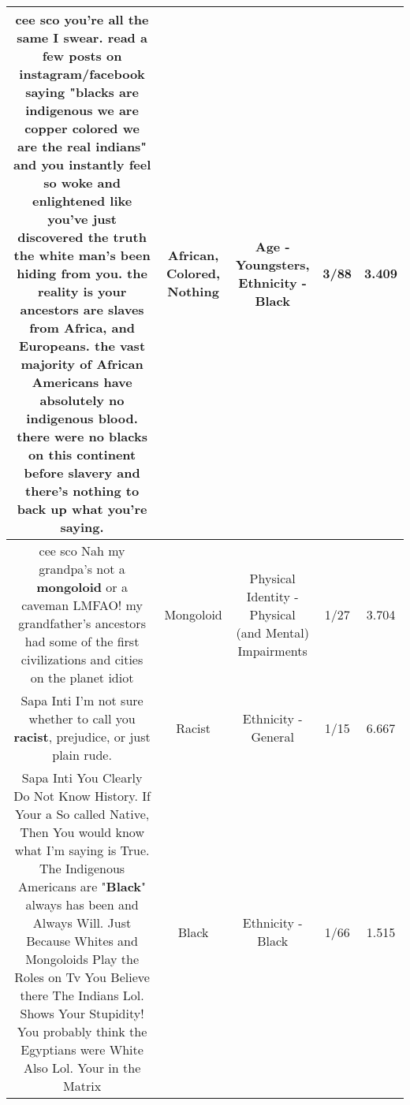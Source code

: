 \documentclass[11pt]{article}
\newlength\mylength
\begin{document}
\begin{center}
\begin{longtable}{|C{.65\mylength}|C{.30\mylength}|C{.12\mylength}|C{.12\mylength}|C{.12\mylength}|}
  \small cee sco you're all the same I swear. read a few posts on instagram/facebook saying "blacks are indigenous we are copper \textbf{colored} we are the real indians" and you instantly feel so woke and enlightened like you've just discovered the truth the white man's been hiding from you. the reality is your ancestors are slaves from Africa, and Europeans. the vast majority of \textbf{African} Americans have absolutely no indigenous blood. there were no blacks on this continent before slavery and there's \textbf{nothing} to back up what you're saying.\normalsize   & African, Colored, Nothing & Age - Youngsters, Ethnicity - Black & 3/88 & 3.409 \\  \hline
  \small cee sco Nah my grandpa's not a \textbf{mongoloid} or a caveman LMFAO! my grandfather's ancestors had some of the first civilizations and cities on the planet idiot\normalsize   & Mongoloid & Physical Identity - Physical (and Mental) Impairments & 1/27 & 3.704 \\  \hline
  \small Sapa Inti I'm not sure whether to call you \textbf{racist}, prejudice, or just plain rude.\normalsize   & Racist & Ethnicity - General & 1/15 & 6.667 \\  \hline
  \small Sapa Inti You Clearly Do Not Know History. If Your a So called Native, Then You would know what I'm saying is True. The Indigenous Americans are "\textbf{Black}" always has been and Always Will. Just Because Whites and Mongoloids Play the Roles on Tv You Believe there The Indians Lol. Shows Your Stupidity! You probably think the Egyptians were White Also Lol. Your in the Matrix\normalsize   & Black & Ethnicity - Black & 1/66 & 1.515 \\  \hline

\end{longtable}
\end{center}
\end{document}

